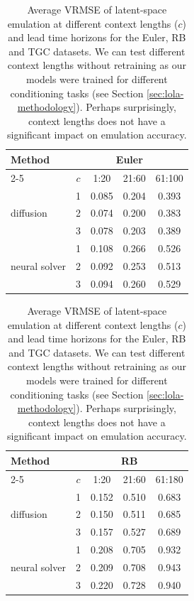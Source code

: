 \begin{subappendices}
\begin{table}[!h]
    \centering
    \caption{Average VRMSE of latent-space emulation at different context lengths ($c$) and lead time horizons for the Euler, RB and TGC datasets. We can test different context lengths without retraining as our models were trained for different conditioning tasks (see Section \ref{sec:lola-methodology}). Perhaps surprisingly, context lengths does not have a significant impact on emulation accuracy.}
    \footnotesize
    \begin{tabular}{lcccc}
        \toprule
        \multirow[c]{2}{*}{Method} & \multicolumn{4}{c}{Euler} \\
        \cmidrule(lr){2-5}
         & $c$ & 1:20 & 21:60 & 61:100 \\
        \midrule
        \multirow[c]{3}{*}{diffusion}
        & 1 & 0.085 & 0.204 & 0.393 \\
        & 2 & 0.074 & 0.200 & 0.383 \\
        & 3 & 0.078 & 0.203 & 0.389 \\
        \midrule
        \multirow[c]{3}{*}{neural solver}
        & 1 & 0.108 & 0.266 & 0.526 \\
        & 2 & 0.092 & 0.253 & 0.513 \\
        & 3 & 0.094 & 0.260 & 0.529 \\
        \bottomrule
    \end{tabular}
    \hspace{1em}
    \begin{tabular}{lcccc}
        \toprule
        \multirow[c]{2}{*}{Method} & \multicolumn{4}{c}{RB} \\
        \cmidrule(lr){2-5}
         & $c$ & 1:20 & 21:60 & 61:180 \\
        \midrule
        \multirow[c]{3}{*}{diffusion}
        & 1 & 0.152 & 0.510 & 0.683 \\
        & 2 & 0.150 & 0.511 & 0.685 \\
        & 3 & 0.157 & 0.527 & 0.689 \\
        \midrule
        \multirow[c]{3}{*}{neural solver}
        & 1 & 0.208 & 0.705 & 0.932 \\
        & 2 & 0.209 & 0.708 & 0.943 \\
        & 3 & 0.220 & 0.728 & 0.940 \\
        \bottomrule
    \end{tabular}

    \vspace{1em}


\end{table}
\end{subappendices}
